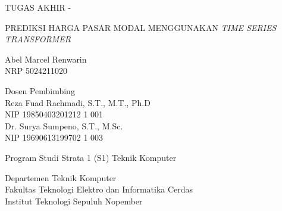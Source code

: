 \begin{large}
  TUGAS AKHIR - \coursecode{}
\end{large}

\vspace{\fill}

\begin{spacing}{1.5}
  \begin{Large}
    {PREDIKSI HARGA PASAR MODAL MENGGUNAKAN \textit{TIME SERIES TRANSFORMER}}
  \end{Large}
\end{spacing}

\vspace{\fill}

\begin{large}
  Abel Marcel Renwarin \\
  \textmd{NRP {5024211020}}
\end{large}

\vspace{\fill}

\begin{large}
  \textmd{Dosen Pembimbing} \\
  {Reza Fuad Rachmadi, S.T., M.T., Ph.D} \\
  \textmd{NIP {19850403201212 1 001}} \\
  {Dr. Surya Sumpeno, S.T., M.Sc.} \\
  \textmd{NIP {19690613199702 1 003}}
\end{large}

\vspace{\fill}

Program Studi Strata 1 (S1) {Teknik Komputer} \\

\mdseries

Departemen {Teknik Komputer} \\
Fakultas {Teknologi Elektro dan Informatika Cerdas} \\
Institut Teknologi Sepuluh Nopember

\place{} \\ \the\year{}
